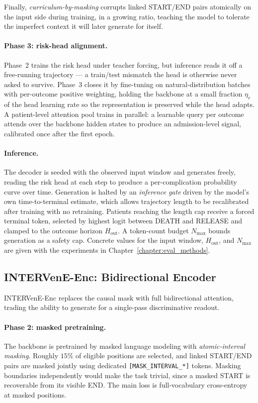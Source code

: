 Finally, \emph{curriculum-by-masking} corrupts linked START/END pairs atomically on the input side during training, in a growing ratio, teaching the model to tolerate the imperfect context it will later generate for itself.

\paragraph{Phase 3: risk-head alignment.}
Phase~2 trains the risk head under teacher forcing, but inference reads it off a free-running trajectory --- a train/test mismatch the head is otherwise never asked to survive. Phase~3 closes it by fine-tuning on natural-distribution batches with per-outcome positive weighting, holding the backbone at a small fraction $\eta_r$ of the head learning rate so the representation is preserved while the head adapts. A patient-level attention pool trains in parallel: a learnable query per outcome attends over the backbone hidden states to produce an admission-level signal, calibrated once after the first epoch.

\paragraph{Inference.}
The decoder is seeded with the observed input window and generates freely, reading the risk head at each step to produce a per-complication probability curve over time. Generation is halted by an \emph{inference gate} driven by the model's own time-to-terminal estimate, which allows trajectory length to be recalibrated after training with no retraining. Patients reaching the length cap receive a forced terminal token, selected by highest logit between DEATH and RELEASE and clamped to the outcome horizon $H_{\mathrm{out}}$. A token-count budget $N_{\max}$ bounds generation as a safety cap. Concrete values for the input window, $H_{\mathrm{out}}$, and $N_{\max}$ are given with the experiments in Chapter~\ref{chapter:eval_methods}.

\subsection{INTERVenE-Enc: Bidirectional Encoder}

INTERVenE-Enc replaces the causal mask with full bidirectional attention, trading the ability to generate for a single-pass discriminative readout.

\paragraph{Phase 2: masked pretraining.}
The backbone is pretrained by masked language modeling with \emph{atomic-interval masking}. Roughly $15\%$ of eligible positions are selected, and linked START/END pairs are masked jointly using dedicated \texttt{[MASK\_INTERVAL\_*]} tokens. Masking boundaries independently would make the task trivial, since a masked START is recoverable from its visible END. The main loss is full-vocabulary cross-entropy at masked positions.

